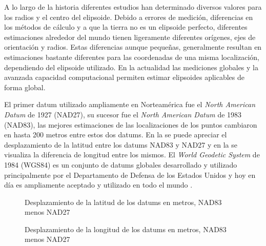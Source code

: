 A lo largo de la historia diferentes estudios han determinado diversos valores para los radios y el centro del elipsoide. Debido a errores de medición, diferencias en los métodos de cálculo y a que la tierra no es un elipsoide perfecto, diferentes estimaciones alrededor del mundo tienen ligeramente diferentes orígenes, ejes de orientación y radios. Estas diferencias aunque pequeñas, generalmente resultan en estimaciones bastante diferentes para las coordenadas de una misma localización, dependiendo del elipsoide utilizado. En la actualidad las mediciones globales y la avanzada capacidad computacional permiten estimar elipsoides aplicables de forma global.

El primer datum utilizado ampliamente en Norteamérica fue el \emph{North American Datum} de 1927 (NAD27), su sucesor fue el \emph{North American Datum} de 1983 (NAD83), las mejores estimaciones de las localizaciones de los puntos cambiaron en hasta 200 metros entre estos dos datums. En la  se puede apreciar el desplazamiento de la latitud entre los datums NAD83 y NAD27 y en la  se visualiza la diferencia de longitud entre los mismos. El \emph{World Geodetic System} de 1984 (WGS84) es un conjunto de datums globales desarrollado y utilizado principalmente por el Departamento de Defensa de los Estados Unidos y hoy en día es ampliamente aceptado y utilizado en todo el mundo \cite{longley2005geographic}.

\begin{figure}[h]
	\centering
	
	\caption[Desplazamiento de la latitud entre NAD83 y NAD27]{Desplazamiento de la latitud de los datums en metros, NAD83 menos NAD27}
	\label{fig:datum-latitud} 
\end{figure}

\begin{figure}[h]
	\centering
	
	\caption[Desplazamiento de la longitud entre NAD83 y NAD27]{Desplazamiento de la longitud de los datums en metros, NAD83 menos NAD27}
	\label{fig:datum-longitud} 
\end{figure}




